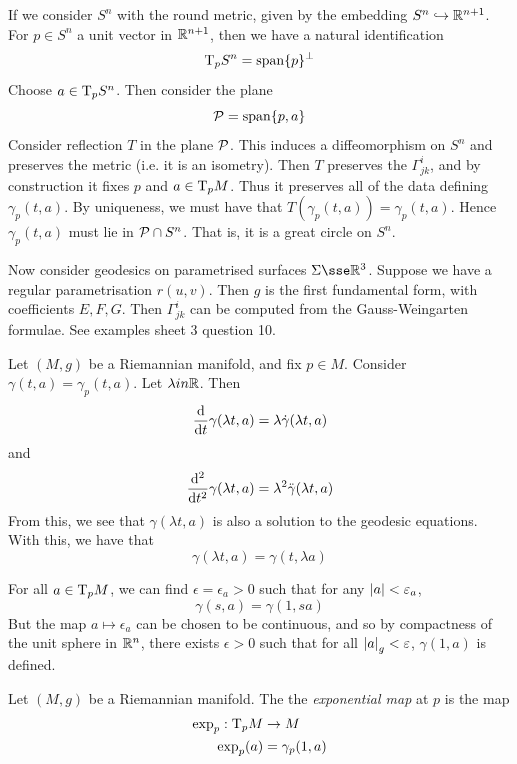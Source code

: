 \documentclass{article}
\begin{document}
\begin{example}
    If we consider \(S^n\) with the round metric, given by the embedding \(S^n \hookrightarrow \mathbb{R}^{n+1}\). For \(p \in S^n\) a unit vector in \(\mathbb{R}^{n+1}\), then we have a natural identification
    \[\mathrm{T}_p S^n = \operatorname{span}\{p\}^\perp\]
    Choose \(a \in \mathrm{T}_pS^n\). Then consider the plane
    \[\mathcal{P} = \operatorname{span}\{p, a\}\]
    Consider reflection \(T\) in the plane \(\mathcal{P}\). This induces a diffeomorphism on \(S^n\) and preserves the metric (i.e. it is an isometry). Then \(T\) preserves the \(\Gamma^i_{jk}\), and by construction it fixes \(p\) and \(a \in \mathrm{T}_p M\). Thus it preserves all of the data defining \(\gamma_p(t, a)\). By uniqueness, we must have that \(T(\gamma_p(t, a)) = \gamma_p(t, a)\). Hence \(\gamma_p(t, a)\) must lie in \(\mathcal{P} \cap S^n\). That is, it is a great circle on \(S^n\).
\end{example}

\begin{example}
    Now consider geodesics on parametrised surfaces \(\Sigma \sse \R^3\). Suppose we have a regular parametrisation \(r(u, v)\). Then \(g\) is the first fundamental form, with coefficients \(E, F, G\). Then \(\Gamma^i_{jk}\) can be computed from the Gauss-Weingarten formulae. See examples sheet 3 question 10.
\end{example}

Let \((M, g)\) be a Riemannian manifold, and fix \(p \in M\). Consider \(\gamma(t, a) = \gamma_p(t, a)\). Let \(\lambda in \mathbb{R}\). Then
\[\dv{t}\gamma(\lambda t, a) = \lambda \dot\gamma(\lambda t, a)\]
and
\[\dv[2]{t}\gamma(\lambda t, a) = \lambda^2 \ddot \gamma(\lambda t, a)\]
From this, we see that \(\gamma(\lambda t, a)\) is also a solution to the geodesic equations. With this, we have that
\[\gamma(\lambda t, a) = \gamma(t, \lambda a)\]

\begin{remark}
    For all \(a \in \mathrm{T}_pM\), we can find \(\epsilon = \epsilon_a > 0\) such that for any \(\abs{a} < \varepsilon_a\),
    \[\gamma(s, a) = \gamma(1, sa)\]
    But the map \(a \mapsto \epsilon_a\) can be chosen to be continuous, and so by compactness of the unit sphere in \(\mathbb{R}^n\), there exists \(\epsilon > 0\) such that for all \(\abs{a}_g < \varepsilon\), \(\gamma(1, a)\) is defined.
\end{remark}

\lec

\begin{definition}
    Let \((M, g)\) be a Riemannian manifold. The the \emph{exponential map} at \(p\) is the map
    \begin{align*}
        \exp_p : \mathrm{T}_p M &\to M \\
        \exp_p(a) &= \gamma_p(1, a)
    \end{align*}
\end{definition}
\end{document}
